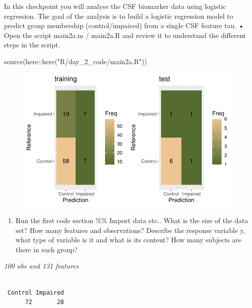 \documentclass[
  letterpaper,
  DIV=11,
  numbers=noendperiod]{scrartcl}
\newenvironment{Shaded}{\begin{snugshade}}{\end{snugshade}}
\newcommand{\FunctionTok}[1]{\textcolor[rgb]{0.28,0.35,0.67}{#1}}
\newcommand{\NormalTok}[1]{\textcolor[rgb]{0.00,0.23,0.31}{#1}}
\newcommand{\SpecialCharTok}[1]{\textcolor[rgb]{0.37,0.37,0.37}{#1}}
\newcommand{\StringTok}[1]{\textcolor[rgb]{0.13,0.47,0.30}{#1}}
\providecommand{\tightlist}{%
  \setlength{\itemsep}{0pt}\setlength{\parskip}{0pt}}\usepackage{longtable,booktabs,array}
\begin{document}
In this checkpoint you will analyse the CSF biomarker data using
logistic regression. The goal of the analysis is to build a logistic
regression model to predict group membership (control/impaired) from a
single CSF feature tau. • Open the script main2a.m / main2a.R and review
it to understand the different steps in the script.

\begin{Shaded}
\begin{Highlighting}[]
\FunctionTok{source}\NormalTok{(here}\SpecialCharTok{::}\FunctionTok{here}\NormalTok{(}\StringTok{"R/day\_2\_code/main2a.R"}\NormalTok{))}
\end{Highlighting}
\end{Shaded}

\begin{figure}[H]

{\centering \includegraphics{excercise_doc_files/figure-pdf/unnamed-chunk-10-1.pdf}

}

\end{figure}

\begin{enumerate}
\def\labelenumi{(\alph{enumi})}
\tightlist
\item
  Run the first code section \%\% Import data etc.. What is the size of
  the data set? How many features and observations? Describe the
  response variable y, what type of variable is it and what is its
  content? How many subjects are there in each group?
\end{enumerate}

\emph{100 obs and 131 features}

\begin{verbatim}

 Control Impaired 
      72       28 
\end{verbatim}
\end{document}
